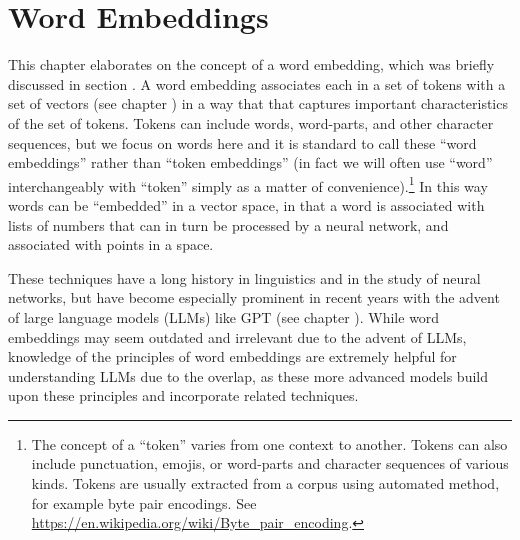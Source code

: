 \chapter{Word Embeddings}\label{ch_word_embeddings}


This chapter elaborates on the concept of a word embedding, which was briefly discussed in section . A word embedding associates each  in a set of tokens with a set of vectors (see chapter ) in a way that that captures important characteristics of the set of tokens. Tokens can include words, word-parts, and other character sequences, but we focus on words here and it is standard to call these ``word embeddings'' rather than ``token embeddings'' (in fact we will often use ``word'' interchangeably with ``token'' simply as a matter of convenience).\footnote{The concept of a ``token'' varies from one context to another. Tokens can also include punctuation, emojis, or word-parts and character sequences of various kinds. Tokens are usually extracted from a corpus using automated method, for example byte pair encodings. See \url{https://en.wikipedia.org/wiki/Byte_pair_encoding}.} In this way words can be ``embedded'' in a vector space, in that a word is associated with lists of numbers that can in turn be processed by a neural network, and associated with points in a space. 

These techniques have a long history in linguistics and in the study of neural networks, but have become especially prominent in recent years with the advent of large language models (LLMs) like GPT (see chapter ). While word embeddings may seem outdated and irrelevant due to the advent of LLMs, knowledge of the principles of word embeddings are extremely helpful for understanding LLMs due to the overlap, as these more advanced models build upon these principles and incorporate related techniques.

